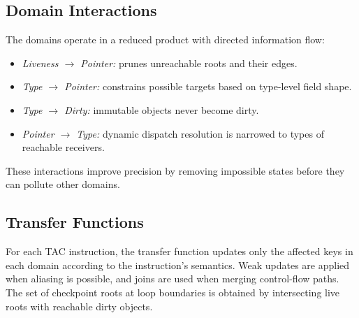 \subsection{Domain Interactions}
The domains operate in a reduced product with directed information flow:
\begin{itemize}
    \item \emph{Liveness $\rightarrow$ Pointer:} prunes unreachable roots and their edges.
    \item \emph{Type $\rightarrow$ Pointer:} constrains possible targets based on type-level field shape.
    \item \emph{Type $\rightarrow$ Dirty:} immutable objects never become dirty.
    \item \emph{Pointer $\rightarrow$ Type:} dynamic dispatch resolution is narrowed to types of reachable receivers.
\end{itemize}
These interactions improve precision by removing impossible states before they can pollute other domains.

\subsection{Transfer Functions}
For each TAC instruction, the transfer function updates only the affected keys in each domain according to the instruction’s semantics.
Weak updates are applied when aliasing is possible, and joins are used when merging control-flow paths.
The set of checkpoint roots at loop boundaries is obtained by intersecting live roots with reachable dirty objects.

